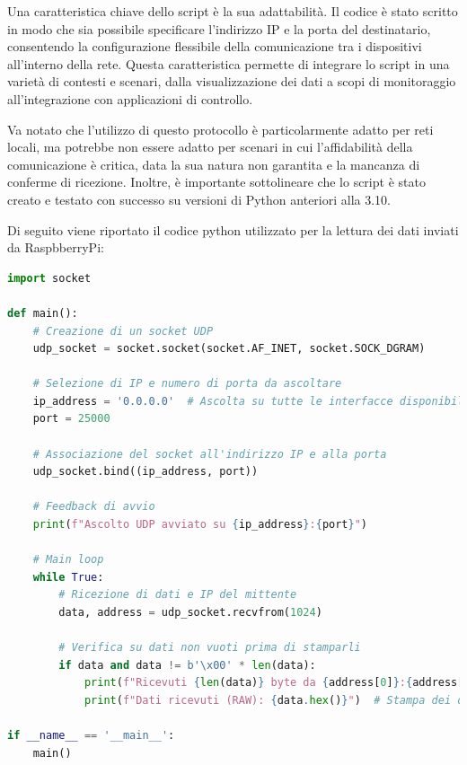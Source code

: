 \documentclass[titlepage]{report}
\begin{document}
	Una caratteristica chiave dello script è la sua adattabilità. Il codice è stato scritto in modo che sia possibile specificare l'indirizzo IP e la porta del destinatario, consentendo la configurazione flessibile della comunicazione tra i dispositivi all'interno della rete. Questa caratteristica permette di integrare lo script in una varietà di contesti e scenari, dalla visualizzazione dei dati a scopi di monitoraggio all'integrazione con applicazioni di controllo.

	Va notato che l'utilizzo di questo protocollo è particolarmente adatto per reti locali, ma potrebbe non essere adatto per scenari in cui l'affidabilità della comunicazione è critica, data la sua natura non garantita e la mancanza di conferme di ricezione. Inoltre, è importante sottolineare che lo script è stato creato e testato con successo su versioni di Python anteriori alla 3.10. \par

	Di seguito viene riportato il codice python utilizzato per la lettura dei dati inviati da RaspbberryPi:

	\begin{lstlisting}[label={lst:udp_listener.py},caption={Script \texttt{udp\_listener.py} per l'ascolto della porta UDP utilizzata dal RaspberryPi}, language=python]
import socket

def main():
    # Creazione di un socket UDP
    udp_socket = socket.socket(socket.AF_INET, socket.SOCK_DGRAM)

    # Selezione di IP e numero di porta da ascoltare
    ip_address = '0.0.0.0'  # Ascolta su tutte le interfacce disponibili
    port = 25000

    # Associazione del socket all'indirizzo IP e alla porta
    udp_socket.bind((ip_address, port))

	# Feedback di avvio
    print(f"Ascolto UDP avviato su {ip_address}:{port}")

	# Main loop
    while True:
        # Ricezione di dati e IP del mittente
        data, address = udp_socket.recvfrom(1024)

        # Verifica su dati non vuoti prima di stamparli
        if data and data != b'\x00' * len(data):
            print(f"Ricevuti {len(data)} byte da {address[0]}:{address[1]}")
            print(f"Dati ricevuti (RAW): {data.hex()}")  # Stampa dei dati in formato esadecimale (hex)

if __name__ == '__main__':
    main()
	\end{lstlisting}
\end{document}
